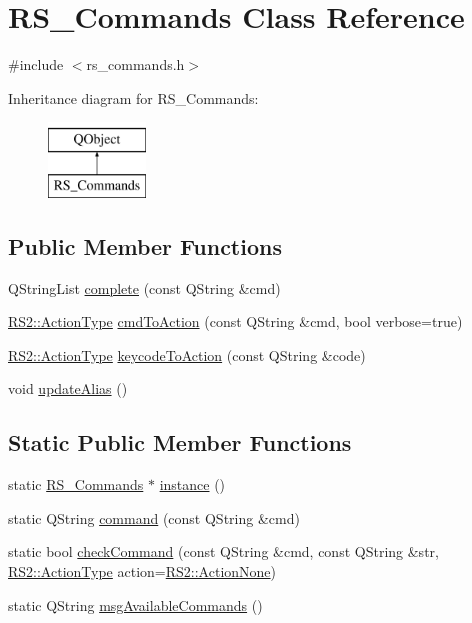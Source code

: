 \hypertarget{classRS__Commands}{\section{R\-S\-\_\-\-Commands Class Reference}
\label{classRS__Commands}
}


{\ttfamily \#include $<$rs\-\_\-commands.\-h$>$}

Inheritance diagram for R\-S\-\_\-\-Commands\-:\begin{figure}[H]
\begin{center}
\leavevmode
\includegraphics[height=2.000000cm]{classRS__Commands}
\end{center}
\end{figure}
\subsection*{Public Member Functions}
\begin{DoxyCompactItemize}
\item 
Q\-String\-List \hyperlink{classRS__Commands_a5a299eea4f7330fdbb6746398377ef02}{complete} (const Q\-String \&cmd)
\item 
\hyperlink{classRS2_afe3523e0bc41fd637b892321cfc4b9d7}{R\-S2\-::\-Action\-Type} \hyperlink{classRS__Commands_a53a2c04019169606e1c8030a9be9dd61}{cmd\-To\-Action} (const Q\-String \&cmd, bool verbose=true)
\item 
\hyperlink{classRS2_afe3523e0bc41fd637b892321cfc4b9d7}{R\-S2\-::\-Action\-Type} \hyperlink{classRS__Commands_a96790431ed4ded14c5a783f43214d3e5}{keycode\-To\-Action} (const Q\-String \&code)
\item 
void \hyperlink{classRS__Commands_ad16464838ba8096dd2a77e9fd44f80fd}{update\-Alias} ()
\end{DoxyCompactItemize}
\subsection*{Static Public Member Functions}
\begin{DoxyCompactItemize}
\item 
static \hyperlink{classRS__Commands}{R\-S\-\_\-\-Commands} $\ast$ \hyperlink{classRS__Commands_afdf816013e3041ec2972004d7dce79e5}{instance} ()
\item 
static Q\-String \hyperlink{classRS__Commands_ac083f1f4be60d2b768162c396bc7390d}{command} (const Q\-String \&cmd)
\item 
static bool \hyperlink{classRS__Commands_a589797b22309d8ac6ddacafb89617fd3}{check\-Command} (const Q\-String \&cmd, const Q\-String \&str, \hyperlink{classRS2_afe3523e0bc41fd637b892321cfc4b9d7}{R\-S2\-::\-Action\-Type} action=\hyperlink{classRS2_afe3523e0bc41fd637b892321cfc4b9d7a87399b91b144b6e5d53f649422fc00c6}{R\-S2\-::\-Action\-None})
\item 
static Q\-String \hyperlink{classRS__Commands_a1e935067cb021c4b2c4127b83d4246e4}{msg\-Available\-Commands} ()
\end{DoxyCompactItemize}
